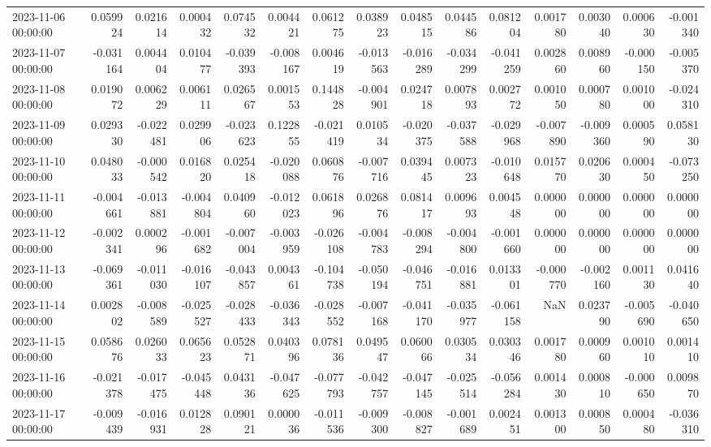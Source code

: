 \begin{tabular}{lrrrrrrrrrrrrrr}
2023-11-06 00:00:00 & 0.059924 & 0.021614 & 0.000432 & 0.074532 & 0.004421 & 0.061275 & 0.038923 & 0.048515 & 0.044586 & 0.081204 & 0.001780 & 0.003040 & 0.000630 & -0.001340 \\
2023-11-07 00:00:00 & -0.031164 & 0.004404 & 0.010477 & -0.039393 & -0.008167 & 0.004619 & -0.013563 & -0.016289 & -0.034299 & -0.041259 & 0.002860 & 0.008960 & -0.000150 & -0.005370 \\
2023-11-08 00:00:00 & 0.019072 & 0.006229 & 0.006111 & 0.026567 & 0.001553 & 0.144828 & -0.004901 & 0.024718 & 0.007893 & 0.002772 & 0.001050 & 0.000780 & 0.001000 & -0.024310 \\
2023-11-09 00:00:00 & 0.029330 & -0.022481 & 0.029906 & -0.023623 & 0.122855 & -0.021419 & 0.010534 & -0.020375 & -0.037588 & -0.029968 & -0.007890 & -0.009360 & 0.000590 & 0.058130 \\
2023-11-10 00:00:00 & 0.048033 & -0.000542 & 0.016820 & 0.025418 & -0.020088 & 0.060876 & -0.007716 & 0.039445 & 0.007323 & -0.010648 & 0.015770 & 0.020630 & 0.000450 & -0.073250 \\
2023-11-11 00:00:00 & -0.004661 & -0.013881 & -0.004804 & 0.040960 & -0.012023 & 0.061896 & 0.026876 & 0.081417 & 0.009693 & 0.004548 & 0.000000 & 0.000000 & 0.000000 & 0.000000 \\
2023-11-12 00:00:00 & -0.002341 & 0.000296 & -0.001682 & -0.007004 & -0.003959 & -0.026108 & -0.004783 & -0.008294 & -0.004800 & -0.001660 & 0.000000 & 0.000000 & 0.000000 & 0.000000 \\
2023-11-13 00:00:00 & -0.069361 & -0.011030 & -0.016107 & -0.043857 & 0.004361 & -0.104738 & -0.050194 & -0.046751 & -0.016881 & 0.013301 & -0.000770 & -0.002160 & 0.001130 & 0.041640 \\
2023-11-14 00:00:00 & 0.002802 & -0.008589 & -0.025527 & -0.028433 & -0.036343 & -0.028552 & -0.007168 & -0.041170 & -0.035977 & -0.061158 & NaN & 0.023790 & -0.005690 & -0.040650 \\
2023-11-15 00:00:00 & 0.058676 & 0.026033 & 0.065623 & 0.052871 & 0.040396 & 0.078136 & 0.049547 & 0.060066 & 0.030534 & 0.030346 & 0.001780 & 0.000960 & 0.001010 & 0.001410 \\
2023-11-16 00:00:00 & -0.021378 & -0.017475 & -0.045448 & 0.043136 & -0.047625 & -0.077793 & -0.042757 & -0.047145 & -0.025514 & -0.056284 & 0.001430 & 0.000810 & -0.000650 & 0.009870 \\
2023-11-17 00:00:00 & -0.009439 & -0.016931 & 0.012828 & 0.090121 & 0.000036 & -0.011536 & -0.009300 & -0.008827 & -0.001689 & 0.002451 & 0.001300 & 0.000850 & 0.000480 & -0.036310 \\

\end{tabular}
